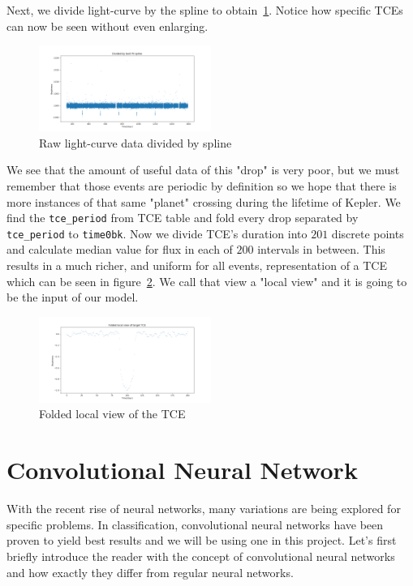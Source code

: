 \documentclass[twoside]{article}
\newcommand{\code}[1]{\texttt{#1}}
\begin{document}
\begin{multicols}{2}
Next, we divide light-curve by the spline to obtain~\ref{fig:divided_lc}. Notice how specific TCEs can now be seen without even enlarging. 
\begin{figure}[H]
\includegraphics[width=0.5\textwidth]{divsplineLC-9517393}
\caption{Raw light-curve data divided by spline}
\label{fig:divided_lc}
\end{figure}

We see that the amount of useful data of this "drop" is very poor, but we must remember that those events are periodic by definition so we hope that there is more instances of that same "planet" crossing during the lifetime of Kepler. We find the \code{tce\_period} from TCE table and fold every drop separated by \code{tce\_period} to \code{time0bk}. Now we divide TCE's duration into $201$ discrete points and calculate median value for flux in each of $200$ intervals in between. This results in a much richer, and uniform for all events, representation of a TCE which can be seen in figure~\ref{fig:folded_tce}. We call that view a "local view" and it is going to be the input of our model.
\begin{figure}[H]
\includegraphics[width=0.5\textwidth]{localvierLCdrop-9517393}
\caption{Folded local view of the TCE}
\label{fig:folded_tce}
\end{figure}

\section{Convolutional Neural Network}
With the recent rise of neural networks, many variations are being explored for specific problems. In classification, convolutional neural networks have been proven to yield best results and we will be using one in this project.  Let's first briefly introduce the reader with the concept of convolutional neural networks and how exactly they differ from regular neural networks.


\end{multicols}
\end{document}
